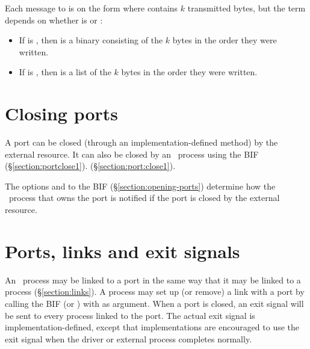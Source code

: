 Each message to  is on the form  where  contains $k$ transmitted
bytes, but the term  depends on whether  is  or :
\begin{itemize}
\item {}
If  is , then  is a binary consisting of the $k$ bytes in the
order they were written.
\item {}
If  is , then  is a list of the $k$ bytes in the
order they were written.
\end{itemize}

\section{Closing ports}

\label{section:closing-ports}

A port can be closed (through an implementation-defined method)
by the external resource.  It can also be closed by an \Erlang\ process
using the BIF
\ifOld{} (\S\ref{section:portclose1}).\fi
\ifStd{} (\S\ref{section:port:close1}).\fi

The options  and  to the BIF 
(\S\ref{section:opening-ports})
determine how the \Erlang\ process that owns
the port is notified if the port is closed by the external resource.

\section{Ports, links and exit signals}

\label{section:port-linking}

An \Erlang\ process may be linked to a port in the same way that it may be linked to a process
(\S\ref{section:links}).
A process  may set up (or remove) a link with a port  by calling the BIF
(or ) with  as argument.
When a port is closed, an exit signal will be sent to
every process linked to the port.  The actual exit signal is implementation-defined, except that
implementations are encouraged to use the exit signal  when the driver or external process
completes normally.

